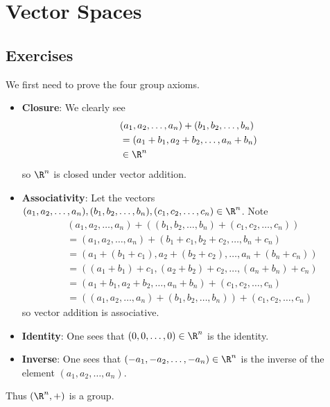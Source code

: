 \section{Vector Spaces}
\subsection*{Exercises}
\begin{questions}
    \item We first need to prove the four group axioms.
    \begin{itemize}
        \item \textbf{Closure}: We clearly see
        \begin{align*}
            &(a_1, a_2, \dots, a_n) + (b_1, b_2, \dots, b_n)\\
            &= (a_1 + b_1, a_2 + b_2, \dots, a_n + b_n)\\
            &\in \R^n
        \end{align*}
        so $\R^n$ is closed under vector addition.

        \item \textbf{Associativity}: Let the vectors $(a_1, a_2, \dots, a_n), (b_1, b_2, \dots, b_n), \linebreak (c_1, c_2, \dots, c_n) \in \R^n$. Note
        \begin{align*}
            &(a_1, a_2, \dots, a_n) + \left((b_1, b_2, \dots, b_n) + (c_1, c_2, \dots, c_n)\right)\\
            &= (a_1, a_2, \dots, a_n) + (b_1 + c_1, b_2 + c_2, \dots, b_n + c_n)\\
            &= (a_1 + (b_1 + c_1), a_2 + (b_2 + c_2), \dots, a_n + (b_n + c_n))\\
            &= ((a_1 + b_1) + c_1, (a_2 + b_2) + c_2, \dots, (a_n + b_n) + c_n)\\
            &= (a_1 + b_1, a_2 + b_2, \dots, a_n + b_n) + (c_1, c_2, \dots, c_n)\\
            &= \left((a_1, a_2, \dots, a_n) + (b_1, b_2, \dots, b_n)\right) + (c_1, c_2, \dots, c_n)
        \end{align*}
        so vector addition is associative.

        \item \textbf{Identity}: One sees that $(0, 0, \dots, 0) \in \R^n$ is the identity.

        \item \textbf{Inverse}: One sees that $(-a_1, -a_2, \dots, -a_n) \in \R^n$ is the inverse of the element $(a_1, a_2, \dots, a_n)$.
    \end{itemize}
    Thus $(\R^n, +)$ is a group.
    

\end{questions}
